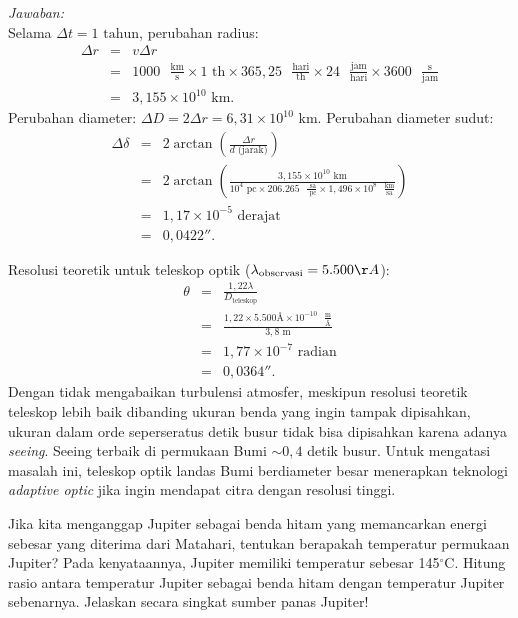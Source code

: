 \documentclass[11pt,fleqn]{exam}
\begin{document}
\begin{questions}
\textit{Jawaban:}\\
Selama $\Delta t=1\text{ tahun}$, perubahan radius:
\begin{eqnarray*}
\Delta r&=&v\Delta r\\
&=&1000\text{ }\frac{\text{km}}{\text{s}}\times 1\text{ th}\times 365,25\text{ }\frac{\text{hari}}{\text{th}}\times 24\text{ }\frac{\text{jam}}{\text{hari}}\times 3600\text{ }\frac{\text{s}}{\text{jam}}\\
&=&3,155\times 10^{10}\text{ km}.
\end{eqnarray*}
Perubahan diameter: $\Delta D=2\Delta r=6,31\times 10^{10}\text{ km}$.
Perubahan diameter sudut:
\begin{eqnarray*}
\Delta\delta&=& 2 \arctan (\frac{\Delta r}{d\text{ (jarak)}})\\
&=&2 \arctan(\frac{3,155\times 10^{10}\text{ km}}{10^4\text{ pc}\times 206.265\text{ }\frac{\text{ sa}}{\text{ pc}}\times 1,496\times 10^8\text{ }\frac{\text{km}}{\text{sa}}})\\
&=&1,17\times 10^{-5}\text{ derajat}\\
&=&0,0422''.
\end{eqnarray*}

Resolusi teoretik untuk teleskop optik ($\lambda_\text{observasi}=5.500\AA$):\\
\begin{eqnarray*}
\theta&=&\frac{1,22\lambda}{D_\text{teleskop}}\\
&=&\frac{1,22\times 5.500\text{\AA}\times 10^{-10}\text{ }\frac{\text{m}}{\text{\AA}}}{3,8\text{ m}}\\
&=&1,77\times 10^{-7}\text{ radian}\\
&=&0,0364''.
\end{eqnarray*}
Dengan tidak mengabaikan turbulensi atmosfer, meskipun resolusi teoretik teleskop lebih baik dibanding ukuran benda yang ingin tampak dipisahkan, ukuran dalam orde seperseratus detik busur tidak bisa dipisahkan karena adanya \textit{seeing}. Seeing terbaik di permukaan Bumi ${\sim}0,4$ detik busur. Untuk mengatasi masalah ini, teleskop optik landas Bumi berdiameter besar menerapkan teknologi \textit{adaptive optic} jika ingin mendapat citra dengan resolusi tinggi.


\question Jika kita menganggap Jupiter sebagai benda hitam yang memancarkan energi sebesar yang diterima dari Matahari, tentukan berapakah temperatur permukaan Jupiter? Pada kenyataannya, Jupiter memiliki temperatur sebesar 145$^{\circ}$C. Hitung rasio antara temperatur Jupiter sebagai benda hitam dengan temperatur Jupiter sebenarnya. Jelaskan secara singkat sumber panas Jupiter!


\end{questions}
\end{document}
